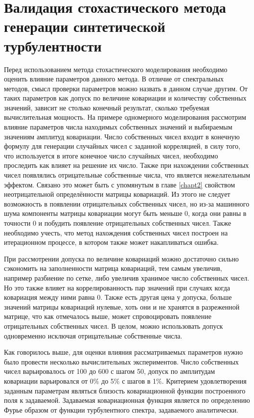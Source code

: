  
\chapter{Валидация стохастического метода генерации синтетической турбулентности} \label{chapt5}
Перед использованием метода стохастического моделирования необходимо оценить влияние параметров данного метода. В отличие от спектральных методов, смысл проверки параметров можно назвать в данном случае другим. От таких параметров как допуск по величине ковариации и количеству собственных значений, зависит не столько конечный результат, сколько требуемая вычислительная мощность. На примере одномерного моделирования рассмотрим влияние параметров числа находимых собственных значений и выбираемым значениям амплитуд ковариации. Число собственных чисел входит в конечную формулу для генерации случайных чисел с заданной корреляцией, в силу того, что используется в итоге конечное число случайных чисел, необходимо проследить как влияет на решение их число. Также при нахождении собственных чисел появлялись отрицательные собственные числа, что является нежелательным эффектом. Связано это может быть с упомянутым в главе \ref{chapt2} свойством неотрицательной определённости матрицы ковариаций. Из этого не следует возможность в появлении отрицательных собственных чисел, но из-за машинного шума компоненты матрицы ковариации могут быть меньше 0, когда они равны в точности 0 и побудить появление отрицательных собственных чисел. Также необходимо учесть, что метод нахождения собственных чисел построен на итерационном процессе, в котором также может накапливаться ошибка.

При рассмотрении допуска по величине ковариаций можно достаточно сильно сэкономить на заполненности матрица ковариаций, тем самым увеличив, например разбиение по сетке, либо увеличив хранимое число собственных чисел. Но это также влияет на коррелированность пар значений при случаях когда ковариация между ними равна 0. Также есть другая цена у допуска, больше значений матрицы ковариаций нулевые, хоть они и не хранятся в разреженной матрице, что как отмечалось выше, может спровоцировать появление отрицательных собственных чисел. В целом, можно использовать допуск одновременно исключая отрицательные собственные числа.

Как говорилось выше, для оценки влияния рассматриваемых параметров нужно было провести несколько вычислительных экспериментов. Число собственных чисел варьировалось от 100 до 600 с шагом 50, допуск по амплитудам ковариации варьировался от 0\% до 5\% с шагов в 1\%. Критерием удовлетворения заданным параметрам являться близость ковариационной функции построенного поля к задаваемой. Задаваемая ковариационная функция является по определению Фурье образом от функции турбулентного спектра, задаваемого аналитически.

